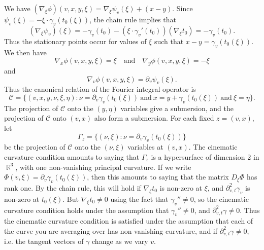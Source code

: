 \documentclass{article}
\theoremstyle{plain}
\theoremstyle{remark}
\theoremstyle{definition}
\DeclareMathOperator{\RR}{\mathbb{R}}
\begin{document}
We have $(\nabla_\xi \phi)(v,x,y,\xi) = \nabla_\xi \psi_v(\xi) + (x - y)$. Since $\psi_v(\xi) = - \xi \cdot \gamma_v(t_0(\xi))$, the chain rule implies that
%
\[ (\nabla_\xi \psi_v)(\xi) = - \gamma_v(t_0) - (\xi \cdot \gamma_v'(t_0)) (\nabla_\xi t_0) = - \gamma_v(t_0). \]
%
Thus the stationary points occur for values of $\xi$ such that $x - y = \gamma_v(t_0(\xi))$. We then have
%
\[ \nabla_x \phi(v,x,y,\xi) = \xi \quad\text{and}\quad \nabla_y \phi(v,x,y,\xi) = - \xi \]
%
and
%
\[ \nabla_v \phi(v,x,y,\xi) = \partial_v \psi_v(\xi). \]
%
Thus the canonical relation of the Fourier integral operator is
%
\[ \mathcal{C} = \Big\{ (v,x,y,\nu,\xi,\eta) : \nu = \partial_v \gamma_v(t_0(\xi))\ \text{and}\ x = y + \gamma_v(t_0(\xi))\ \text{and}\ \xi = \eta \Big\}. \]
%
The projection of $\mathcal{C}$ onto the $(y,\eta)$ variables give a submersion, and the projection of $\mathcal{C}$ onto $(v,x)$ also form a submersion. For each fixed $z = (v,x)$, let
%
\[ \Gamma_z = \Big\{ (\nu,\xi) : \nu = \partial_v \gamma_v(t_0(\xi)) \Big\} \]
%
be the projection of $\mathcal{C}$ onto the $(\nu,\xi)$ variables at $(v,x)$. The cinematic curvature condition amounts to saying that $\Gamma_z$ is a hypersurface of dimension $2$ in $\RR^3$, with one non-vanishing principal curvature. If we write $\Phi(v,\xi) = \partial_v \gamma_v(t_0(\xi))$, then this amounts to saying that the matrix $D_\xi \Phi$ has rank one. By the chain rule, this will hold if $\nabla_\xi t_0$ is non-zero at $\xi$, and $\partial^2_{v,t} \gamma_v$ is non-zero at $t_0(\xi)$. But  $\nabla_\xi t_0 \neq 0$ using the fact that $\gamma_v'' \neq 0$, so the cinematic curvature condition holds under the assumption that $\gamma_v'' \neq 0$, and $\partial^2_{v,t} \gamma \neq 0$. Thus the cinematic curvature condition is satisfied under the assumption that each of the curve you are averaging over has non-vanishing curvature, and if $\partial^2_{v,t} \gamma \neq 0$, i.e. the tangent vectors of $\gamma$ change as we vary $v$.
\end{document}
